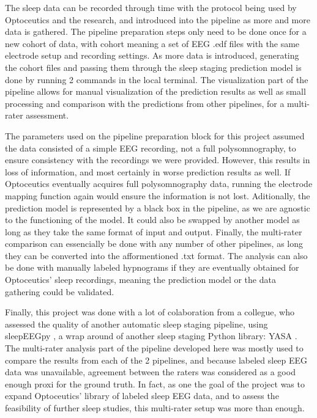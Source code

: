 The sleep data can be recorded through time with the protocol being used by Optoceutics and the research, and introduced into the pipeline as more and more data is gathered. The pipeline preparation steps only need to be done once for a new cohort of data, with cohort meaning a set of EEG .edf files with the same electrode setup and recording settings. As more data is introduced, generating the cohort files and passing them through the sleep staging prediction model is done by running 2 commands in the local terminal. The visualization part of the pipeline allows for manual visualization of the prediction results as well as small processing and comparison with the predictions from other pipelines, for a multi-rater assessment.

The parameters used on the pipeline preparation block for this project assumed the data consisted of a simple EEG recording, not a full polysomnography, to ensure consistency with the recordings we were provided. However, this results in loss of information, and most certainly in worse prediction results as well. If Optoceutics eventually acquires full polysomnography data, running the electrode mapping function again would ensure the information is not lost.
Aditionally, the prediction model is represented by a black box in the pipeline, as we are agnostic to the functioning of the model. It could also be swapped by another model as long as they take the same format of input and output. 
Finally, the multi-rater comparison can essencially be done with any number of other pipelines, as long they can be converted into the afformentioned .txt format. The analysis can also be done with manually labeled hypnograms if they are eventually obtained for Optoceutics' sleep recordings, meaning the prediction model or the data gathering could be validated. 

Finally, this project was done with a lot of colaboration from a collegue, who assessed the quality of another automatic sleep staging pipeline, using sleepEEGpy \cite{belonosov2023sleepeegpy}, a wrap around of another sleep staging Python library: YASA \cite{2021yasa}. The multi-rater analysis part of the pipeline developed here was mostly used to compare the results from each of the 2 pipelines, and because labeled sleep EEG data was unavailable, agreement between the raters was considered as a good enough proxi for the ground truth. In fact, as one the goal of the project was to expand Optoceutics' library of labeled sleep EEG data, and to assess the feasibility of further sleep studies, this multi-rater setup was more than enough.






